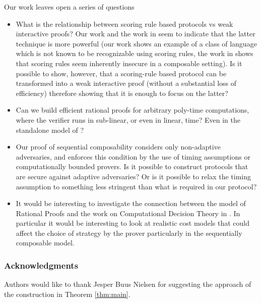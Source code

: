 \documentclass{llncs}
\begin{document}
	Our work leaves open a series of questions
	\begin{itemize}
		\item What is the relationship between scoring rule based protocols vs weak interactive proofs? Our work and the work in \cite{cg15} seem to indicate that the latter technique is more powerful (our work shows an example of a class of language which is not known to be recognizable using scoring rules, the work in \cite{cg15} shows that scoring rules seem inherently insecure in a composable setting). Is it possible to show, however, that a scoring-rule based protocol can be transformed into a weak interactive proof (without a substantial loss of efficiency) therefore showing that it is enough to focus on the latter?
		
		\item Can we build efficient rational proofs for arbitrary poly-time computations, where the verifier runs in sub-linear, or even in linear, time? Even in the standalone model of \cite{am}?
		
		\item Our proof of sequential composability considers only non-adaptive adversaries, and enforces this condition by the use of timing assumptions or computationally bounded provers. Is it possible to construct protocols that are secure against adaptive adversaries? Or is it possible to relax the timing assumption to something less stringent than what is required in our protocol?
		
		\item It would be interesting to investigate the connection between the model of Rational Proofs and the work on Computational Decision Theory in  \cite{halpern2011don}. In particular it would be interesting to look at realistic cost models that could affect the choice of strategy by the prover particularly in the sequentially composable model. 
	\end{itemize}
	
	

\subsubsection*{Acknowledgments}
Authors would like to thank Jesper Buus Nielsen for suggesting the approach of the construction in Theorem \ref{thm:main}.




\end{document}
